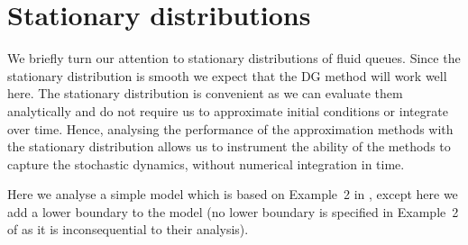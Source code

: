 \FloatBarrier
\section{Stationary distributions} \label{sec:stat}
We briefly turn our attention to stationary distributions of fluid queues. Since the stationary distribution is smooth we expect that the DG method will work well here. The stationary distribution is convenient as we can evaluate them analytically \cite{s2017} and do not require us to approximate initial conditions or integrate over time. Hence, analysing the performance of the approximation methods with the stationary distribution allows us to instrument the ability of the methods to capture the stochastic dynamics, without numerical integration in time.

Here we analyse a simple model which is based on Example~2 in \citep{bean2009}, except here we add a lower boundary to the model (no lower boundary is specified in Example~2 of \citep{bean2009} as it is inconsequential to their analysis). 



